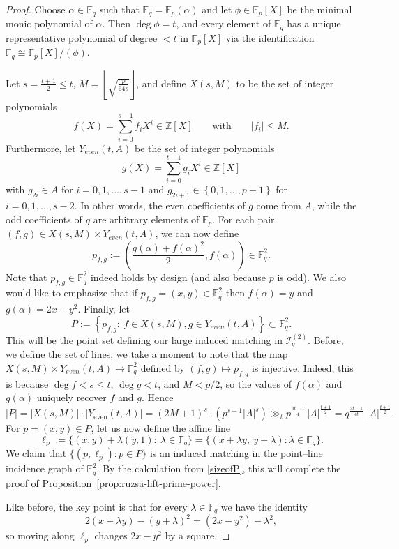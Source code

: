 \documentclass[12pt,reqno]{amsart}
\theoremstyle{plain}
\theoremstyle{definition}
\newcommand{\F}{\mathbb{F}}
\newcommand{\Z}{\mathbb{Z}}
\newcommand{\II}{\mathcal{I}}
\newcommand{\1}{\mathbf{1}}
\begin{document}
\begin{proof}
Choose $\alpha\in \F_q$ such that $\F_q=\F_p(\alpha)$ and let $\phi\in\F_p[X]$ be the minimal monic polynomial of $\alpha$.
Then $\deg\phi=t$, and every element of $\F_q$ has a unique representative polynomial of degree $<t$ in $\F_p[X]$
via the identification $\F_q\cong \F_p[X]/(\phi)$.

Let $s=\frac{t+1}{2} \leq t$, $M = \left\lfloor \sqrt{\frac{p}{64s}}\right\rfloor$, and define $X(s,M)$ to be the set of integer polynomials
 \[
 f(X)=\sum_{i=0}^{s-1} f_i X^i \in \Z[X]
  \qquad\text{with}\qquad |f_i|\le M.
  \]
  Furthermore, let $Y_{even}(t,A)$ be the set of integer polynomials
  \[
  g(X)=\sum_{i=0}^{t-1} g_i X^i \in \Z[X]
  \]
  with $g_{2i} \in A$ for $i=0,1,\ldots,s-1$ and $g_{2i+1} \in \left\{0,1,\ldots,p-1\right\}$ for $i=0,1,\ldots,s-2$. In other words, the even coefficients of $g$ come from $A$, while the odd coefficients of $g$ are arbitrary elements of $\F_p$. For each pair $(f,g)\in X(s,M)\times Y_{even}(t,A)$, we can now define
  \[
  p_{f,g}:=\left( \frac{g(\alpha)+f(\alpha)^2}{2},f(\alpha) \right) \in \F_{q}^{2}.
  \]
  Note that $p_{f,g} \in \F_q^2$ indeed holds by design (and also because $p$ is odd). We also would like to emphasize that if $p_{f,g}=(x,y) \in \F_{q}^{2}$ then $f(\alpha)=y$ and $g(\alpha)=2x-y^2$. Finally, let 
  \[
  P := \left\{p_{f,g}:\ f \in X(s,M), g \in Y_{even}(t,A)\right\} \subset \F_{q}^{2}.
  \]
  This will be the point set defining our large induced matching in $\II_{q}^{(2)}$. Before, we define the set of lines, we take a moment to note that the map $X(s,M)\times Y_{even}(t,A) \to \F_{q}^2$ defined by $(f,g) \mapsto p_{f,q}$ is injective. Indeed, this is because $\deg f < s \leq t$, $\deg g < t$, and $M < p/2$, so the values of $f(\alpha)$ and $g(\alpha)$ uniquely recover $f$ and $g$. Hence
\begin{equation*} \label{sizeofP}
  |P|=|X(s,M)|\cdot |Y_{\mathrm{even}}(t,A)|
  =(2M+1)^s\cdot (p^{s-1}|A|^s) \gg_{t} p^{\frac{3t-1}{4}}\,|A|^{\frac{t+1}{2}}
   = q^{\frac{3t-1}{4t}}\;|A|^{\frac{t+1}{2}}.
\end{equation*}
For $p=(x,y)\in P$, let us now define the affine line
\[
  \ell_p:=\{(x,y)+\lambda(y,1):\ \lambda\in\F_q\}
  =\{(x+\lambda y,\ y+\lambda):\lambda\in\F_q\}.
\]
We claim that $\{(p,\ell_p):p\in P\}$ is an induced matching in the point--line incidence graph of $\F_q^2$. By the calculation from \eqref{sizeofP}, this will complete the proof of Proposition~\ref{prop:ruzsa-lift-prime-power}.

Like before, the key point is that for every $\lambda\in\F_q$ we have the identity
\begin{equation}\label{eq:square-shift-even}
  2(x+\lambda y)-(y+\lambda)^2 = (2x-y^2)-\lambda^2,
\end{equation}
so moving along $\ell_p$ changes $2x-y^2$ by a square. 


\end{proof}
\end{document}
